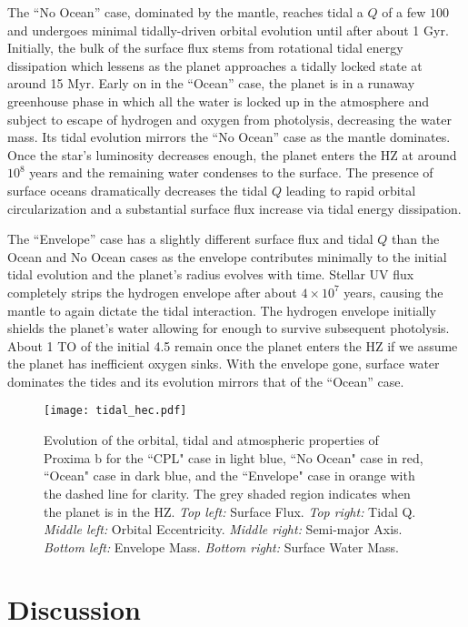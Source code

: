 \documentclass[preprint,12pt]{aastex}
\begin{document}
The ``No Ocean'' case, dominated by the mantle, reaches tidal a $Q$ of a few
$100$ and undergoes minimal tidally-driven orbital evolution until
after about 1 Gyr.  Initially, the bulk of the surface flux stems from
rotational tidal energy dissipation which lessens as the planet
approaches a tidally locked state at around 15 Myr. Early on in the
``Ocean'' case, the planet is in a runaway greenhouse phase in which all
the water is locked up in the atmosphere and subject to escape of
hydrogen and oxygen from photolysis, decreasing the water mass.  Its
tidal evolution mirrors the ``No Ocean'' case as the mantle dominates.
Once the star's luminosity decreases enough, the planet enters the HZ
at around $10^8$ years and the remaining water condenses to the
surface. The presence of surface oceans dramatically decreases the
tidal $Q$ leading to rapid orbital circularization and a substantial
surface flux increase via tidal energy dissipation.

The ``Envelope'' case has a slightly different surface flux and tidal $Q$
than the Ocean and No Ocean cases as the envelope contributes
minimally to the initial tidal evolution and the planet's radius
evolves with time.  Stellar UV flux completely strips the
hydrogen envelope after about $4 \times 10^7$ years, causing the mantle
to again dictate the tidal interaction.  The hydrogen envelope
initially shields the planet's water allowing for enough to survive
subsequent photolysis. About 1 TO of the initial 4.5
remain once the planet enters the HZ if we assume the planet has
inefficient oxygen sinks.  With the envelope gone, surface water
dominates the tides and its evolution mirrors that of the ``Ocean'' case.

\begin{figure} 
\centering
\texttt{[image: tidal\_hec.pdf]}
\caption{Evolution of the orbital, tidal and atmospheric properties of
  Proxima b for the ``CPL" case in light blue, ``No Ocean" case in
  red, ``Ocean" case in dark blue, and the ``Envelope" case in orange
  with the dashed line for clarity.  The grey shaded region indicates
  when the planet is in the HZ. {\it Top left:} Surface Flux. {\it Top
    right:} Tidal Q. {\it Middle left:} Orbital Eccentricity. {\it
    Middle right:} Semi-major Axis. {\it Bottom left:} Envelope
  Mass. {\it Bottom right:} Surface Water Mass.}
\label{fig:tidal_hec}
\end{figure}

\section{Discussion\label{sec:disc}}
\end{document}
